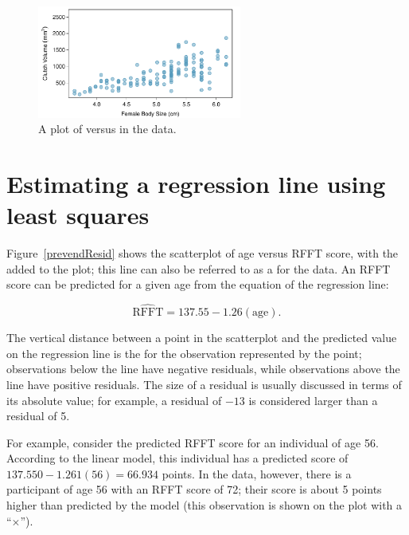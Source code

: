 \begin{figure}[h]
	\centering
	\includegraphics[width=0.6\textwidth]
	{ch_intro_to_data_oi_biostat/figures/frogClutchVolBodySize/frogClutchVolBodySize}
	\caption{A plot of  versus  in the  data.}
	\label{frogClutchVolBodySizeRegress}
\end{figure}

\section{Estimating a regression line using least squares}
\label{estimatingLeastSquaresLine}



Figure~\ref{prevendResid} shows the scatterplot of age versus RFFT score, with the  added to the plot; this line can also be referred to as a  for the data. An RFFT score can be predicted for a given age from the equation of the regression line:

\[\widehat{\text{RFFT}} = 137.55 - 1.26(\text{age}). \]


The vertical distance between a point in the scatterplot and the predicted value on the regression line is the  for the observation represented by the point; observations below the line have negative residuals, while observations above the line have positive residuals. The size of a residual is usually discussed in terms of its absolute value; for example, a residual of $-13$ is considered larger than a residual of 5.

For example, consider the predicted RFFT score for an individual of age 56. According to the linear model, this individual has a predicted score of $137.550 - 1.261(56) = 66.934$ points. In the data, however, there is a participant of age 56 with an RFFT score of 72; their score is about 5 points higher than predicted by the model (this observation is shown on the plot with a ``$\times$'').


